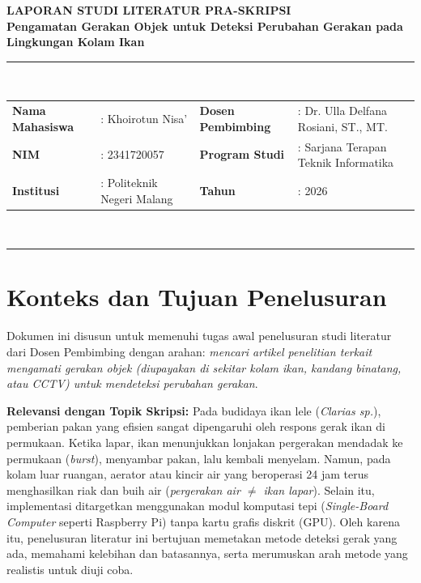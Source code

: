 \documentclass[11pt,a4paper]{article}
\begin{document}
\begin{center}
    {\Large\bfseries LAPORAN STUDI LITERATUR PRA-SKRIPSI}\\[0.3em]
    {\large\bfseries Pengamatan Gerakan Objek untuk Deteksi Perubahan Gerakan pada Lingkungan Kolam Ikan}\\[0.6em]
    \rule{\textwidth}{1pt}\\[0.5em]
    \noindent
    \begin{tabularx}{\textwidth}{@{}l X l X@{}}
        \textbf{Nama Mahasiswa} & : Khoirotun Nisa' & \textbf{Dosen Pembimbing} & : Dr. Ulla Delfana Rosiani, ST., MT. \\
        \textbf{NIM} & : 2341720057 & \textbf{Program Studi} & : Sarjana Terapan Teknik Informatika \\
        \textbf{Institusi} & : Politeknik Negeri Malang & \textbf{Tahun} & : 2026 \\
    \end{tabularx}\\[0.3em]
    \rule{\textwidth}{1pt}
\end{center}

\vspace{0.3em}

\section{Konteks dan Tujuan Penelusuran}
Dokumen ini disusun untuk memenuhi tugas awal penelusuran studi literatur dari Dosen Pembimbing dengan arahan: \textit{mencari artikel penelitian terkait mengamati gerakan objek (diupayakan di sekitar kolam ikan, kandang binatang, atau CCTV) untuk mendeteksi perubahan gerakan}.

\textbf{Relevansi dengan Topik Skripsi:}
Pada budidaya ikan lele (\textit{Clarias sp.}), pemberian pakan yang efisien sangat dipengaruhi oleh respons gerak ikan di permukaan. Ketika lapar, ikan menunjukkan lonjakan pergerakan mendadak ke permukaan (\textit{burst}), menyambar pakan, lalu kembali menyelam. Namun, pada kolam luar ruangan, aerator atau kincir air yang beroperasi 24 jam terus menghasilkan riak dan buih air (\textit{pergerakan air $\neq$ ikan lapar}). Selain itu, implementasi ditargetkan menggunakan modul komputasi tepi (\textit{Single-Board Computer} seperti Raspberry Pi) tanpa kartu grafis diskrit (GPU). Oleh karena itu, penelusuran literatur ini bertujuan memetakan metode deteksi gerak yang ada, memahami kelebihan dan batasannya, serta merumuskan arah metode yang realistis untuk diuji coba.
\end{document}
